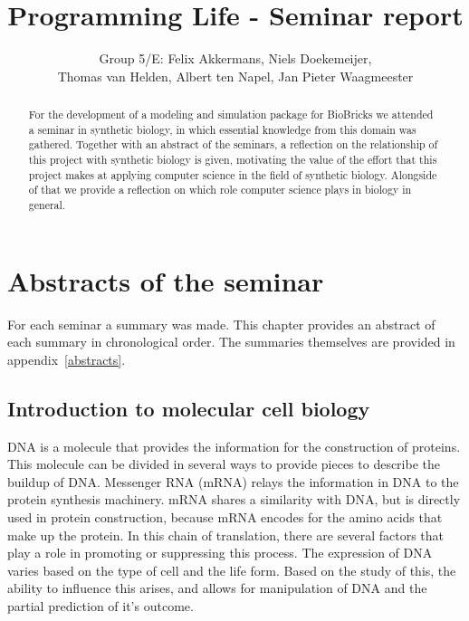 \documentclass[a4paper]{article}
\title{Programming Life - Seminar report}
\author{
Group 5/E: 
 Felix Akkermans,  
Niels Doekemeijer, \\
Thomas van Helden, 
Albert ten Napel,
Jan Pieter Waagmeester 
}
\begin{document}
\maketitle

\begin{abstract}
\noindent For the  development of a modeling and simulation package for BioBricks we attended a seminar in synthetic biology, in which essential knowledge from this domain was gathered. Together with an abstract of the seminars, a reflection on the relationship of this project with synthetic biology is given, motivating the value of the effort that this project makes at applying computer science in the field of synthetic biology. Alongside of that we provide a reflection on which role computer science plays in biology in general.
\end{abstract}

\section{Abstracts of the seminar}
For each seminar a summary was made. This chapter provides an abstract of each summary in chronological order. The summaries themselves are provided in appendix~\ref{abstracts}.

\subsection{Introduction to molecular cell biology}
DNA is a molecule that provides the information for the construction of proteins. This molecule can be divided in several ways to provide pieces to describe the buildup of DNA. Messenger RNA (mRNA) relays the information in DNA to the protein synthesis machinery. mRNA shares a similarity with DNA, but is directly used in protein construction, because mRNA encodes for the amino acids that  make up the protein. In this chain of translation, there are several factors that play a role in promoting or suppressing this process. The expression of DNA varies based on the type of cell and the life form. Based on the study of this, the ability to influence this arises, and allows for manipulation of DNA and the partial prediction of it's outcome. 
\end{document}
